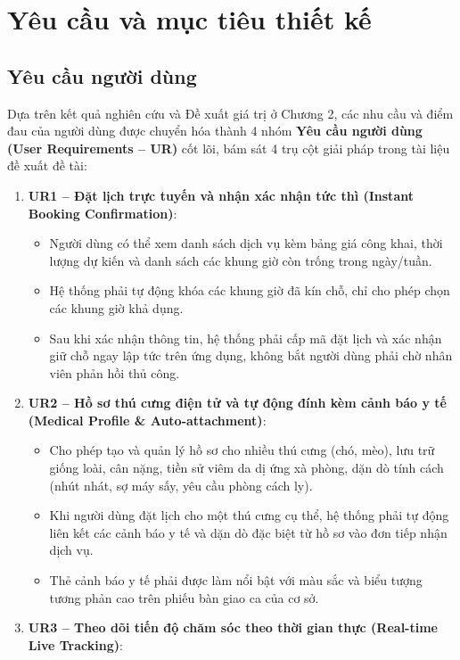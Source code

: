 \section{Yêu cầu và mục tiêu thiết kế}

\subsection{Yêu cầu người dùng}
Dựa trên kết quả nghiên cứu và Đề xuất giá trị ở Chương 2, các nhu cầu và điểm đau của người dùng được chuyển hóa thành 4 nhóm \textbf{Yêu cầu người dùng (User Requirements -- UR)} cốt lõi, bám sát 4 trụ cột giải pháp trong tài liệu đề xuất đề tài:

\begin{enumerate}
    \item \textbf{UR1 -- Đặt lịch trực tuyến và nhận xác nhận tức thì (Instant Booking Confirmation)}:
    \begin{itemize}
        \item Người dùng có thể xem danh sách dịch vụ kèm bảng giá công khai, thời lượng dự kiến và danh sách các khung giờ còn trống trong ngày/tuần.
        \item Hệ thống phải tự động khóa các khung giờ đã kín chỗ, chỉ cho phép chọn các khung giờ khả dụng.
        \item Sau khi xác nhận thông tin, hệ thống phải cấp mã đặt lịch và xác nhận giữ chỗ ngay lập tức trên ứng dụng, không bắt người dùng phải chờ nhân viên phản hồi thủ công.
    \end{itemize}
    \item \textbf{UR2 -- Hồ sơ thú cưng điện tử và tự động đính kèm cảnh báo y tế (Medical Profile \& Auto-attachment)}:
    \begin{itemize}
        \item Cho phép tạo và quản lý hồ sơ cho nhiều thú cưng (chó, mèo), lưu trữ giống loài, cân nặng, tiền sử viêm da dị ứng xà phòng, dặn dò tính cách (nhút nhát, sợ máy sấy, yêu cầu phòng cách ly).
        \item Khi người dùng đặt lịch cho một thú cưng cụ thể, hệ thống phải tự động liên kết các cảnh báo y tế và dặn dò đặc biệt từ hồ sơ vào đơn tiếp nhận dịch vụ.
        \item Thẻ cảnh báo y tế phải được làm nổi bật với màu sắc và biểu tượng tương phản cao trên phiếu bàn giao ca của cơ sở.
    \end{itemize}
    \item \textbf{UR3 -- Theo dõi tiến độ chăm sóc theo thời gian thực (Real-time Live Tracking)}:

\end{enumerate}
